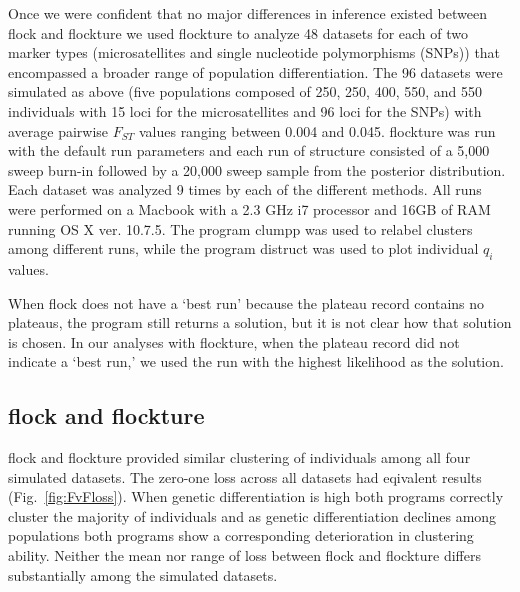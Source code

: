 Once we were confident that no major differences in inference existed between 
{\sc flock} and {\sc flockture} we used {\sc flockture} to analyze 48 datasets for each of two marker types 
(microsatellites and single nucleotide polymorphisms (SNPs))  that encompassed a broader range
of population differentiation. The 96 datasets were simulated as above (five populations 
composed of 250, 250, 400, 550, and 550 individuals with 15 loci for the microsatellites
and 96 loci for the SNPs)
with average pairwise $F_{ST}$ values ranging between 0.004 and 0.045. 
 {\sc flockture} was run with the default run parameters and each run of 
{\sc structure} consisted of a 5,000 sweep burn-in followed by a 20,000 sweep sample
from the posterior distribution. Each dataset was analyzed 9 times by each of the different
methods. All runs were performed on a Macbook with a 2.3 GHz i7 processor
and 16GB of RAM running OS X ver. 10.7.5. The program {\sc clumpp} \citep{Jak&Ros2007} 
was used to relabel clusters among different runs,
while the program {\sc distruct} \citep{Rosenberg2004} was used to plot individual \textit{$q_i$} values.

When {\sc flock} does not have a `best run' because the plateau record contains no plateaus, the program still returns a solution, but it is not clear how that solution is chosen.  In
our analyses  with {\sc flockture}, when the plateau record did not indicate a `best run,' we used the
run with the highest likelihood as the solution.

\subsection*{{\sc flock} and {\sc flockture}} 
{\sc flock} and {\sc flockture} provided similar clustering of individuals among all four 
simulated datasets. The zero-one loss across all datasets had eqivalent results (Fig.~\ref{fig:FvFloss}).
When genetic differentiation is high both programs correctly cluster the majority of individuals and 
as genetic differentiation declines among populations both programs show a corresponding deterioration in 
clustering ability. Neither the mean nor range of loss between {\sc flock} and {\sc flockture} differs
substantially among the simulated datasets.  

